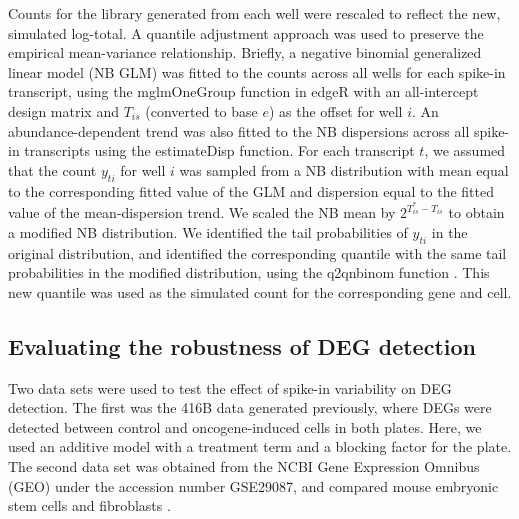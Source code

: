 \documentclass{article}
\begin{document}
Counts for the library generated from each well were rescaled to reflect the new, simulated log-total.
A quantile adjustment approach was used to preserve the empirical mean-variance relationship.
Briefly, a negative binomial generalized linear model (NB GLM) was fitted to the counts across all wells for each spike-in transcript, using the mglmOneGroup function in edgeR \cite{mccarthy2012differential, robinson2010edgeR} with an all-intercept design matrix and $T_{is}$ (converted to base $e$) as the offset for well $i$.
An abundance-dependent trend was also fitted to the NB dispersions across all spike-in transcripts using the estimateDisp function.
For each transcript $t$, we assumed that the count $y_{ti}$ for well $i$ was sampled from a NB distribution with mean equal to the corresponding fitted value of the GLM and dispersion equal to the fitted value of the mean-dispersion trend.
We scaled the NB mean by $2^{T^*_{is} - T_{is}}$ to obtain a modified NB distribution.
We identified the tail probabilities of $y_{ti}$ in the original distribution, and identified the corresponding quantile with the same tail probabilities in the modified distribution, using the q2qnbinom function \cite{robinson2008small}.
This new quantile was used as the simulated count for the corresponding gene and cell.


\subsection{Evaluating the robustness of DEG detection}
Two data sets were used to test the effect of spike-in variability on DEG detection.
The first was the 416B data generated previously, where DEGs were detected between control and oncogene-induced cells in both plates.
Here, we used an additive model with a treatment term and a blocking factor for the plate.
The second data set was obtained from the NCBI Gene Expression Omnibus (GEO) under the accession number GSE29087, and compared mouse embryonic stem cells and fibroblasts \cite{islam2011characterization}.
\end{document}
